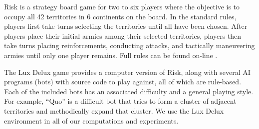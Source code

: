 \documentclass[letterpaper]{article}
\numberwithin{equation}{section}
\numberwithin{theorem}{section}
\numberwithin{lemma}{section}
\numberwithin{df}{section}
\begin{document}
Risk is a strategy board game for two to six players where the objective is to occupy all 42 territories in 6 continents on the board.  %
In the standard rules, players first take turns selecting the territories until all have been chosen.  After players place their initial armies among their selected territories, players then take turns placing reinforcements, conducting attacks, and tactically maneuvering armies until only one player remains.  %
Full rules can be found on-line \cite{Risk}. %

The Lux Delux \cite{Lux} %
game provides a computer version of Risk, along with several AI programs (bots) with source code to play against, all of which are rule-based.  Each of the included bots has an associated difficulty and a general playing style.  For example, ``Quo'' is a difficult bot that tries to form a cluster of adjacent territories and methodically expand that cluster.  We use the Lux Delux environment in all of our computations and experiments.
\end{document}
